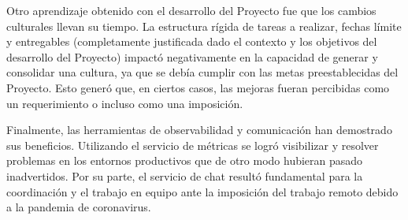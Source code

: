 Otro aprendizaje obtenido con el desarrollo del Proyecto fue que los
cambios culturales llevan su tiempo. La estructura rígida de tareas a
realizar, fechas límite y entregables (completamente justificada
dado el contexto y los objetivos del desarrollo del Proyecto)
impactó negativamente en la capacidad de generar y consolidar una
cultura, ya que se debía cumplir con las metas preestablecidas
del Proyecto. Esto generó que, en ciertos casos, las mejoras fueran
percibidas como un requerimiento o incluso como una imposición.

Finalmente, las herramientas de observabilidad y comunicación han
demostrado sus beneficios. Utilizando el servicio de métricas se logró
visibilizar y resolver problemas en los entornos productivos que de
otro modo hubieran pasado inadvertidos. Por su parte, el servicio de
chat resultó fundamental para la coordinación y el trabajo en equipo
ante la imposición del trabajo remoto debido a la pandemia de
coronavirus.

